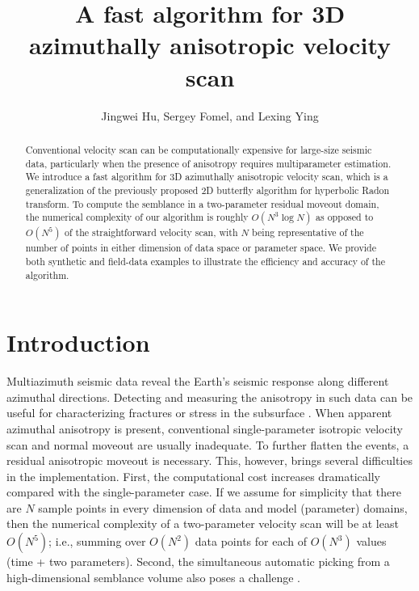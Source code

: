 \title{A fast algorithm for 3D azimuthally anisotropic velocity scan}
\author{Jingwei Hu, Sergey Fomel, and Lexing Ying} 
  

\maketitle

\begin{abstract}
Conventional velocity scan can be computationally expensive for large-size seismic data, particularly when the presence of anisotropy requires multiparameter estimation. We introduce a fast algorithm for 3D azimuthally anisotropic velocity scan, which is a generalization of the previously proposed 2D butterfly algorithm for hyperbolic Radon transform. To compute the semblance in a two-parameter residual moveout domain, the numerical complexity of our algorithm is roughly $O(N^3\log N)$ as opposed to $O(N^5)$ of the straightforward velocity scan, with $N$ being representative of the number of points in either dimension of data space or parameter space. We provide both synthetic and field-data examples to illustrate the efficiency and accuracy of the algorithm.
\end{abstract}


\section{Introduction}

Multiazimuth seismic data reveal the Earth's seismic response along different azimuthal directions. Detecting and measuring the anisotropy in such data can be useful for characterizing fractures or stress in the subsurface \citep{TG}. When apparent azimuthal anisotropy is present, conventional single-parameter isotropic velocity scan and normal moveout are usually inadequate. To further flatten the events, a residual anisotropic moveout is necessary. This, however, brings several difficulties in the implementation. First, the computational cost increases dramatically compared with the single-parameter case. If we assume for simplicity that there are $N$ sample points in every dimension of data and model (parameter) domains, then the numerical complexity of a two-parameter velocity scan will be at least $O(N^5)$; i.e., summing over $O(N^2)$ data points for each of $O(N^3)$ values (time + two parameters). Second, the simultaneous automatic picking from a high-dimensional semblance volume also poses a challenge \citep{AB99, SMGSTH03, ARDC04, TDSFMHCO12}. 

